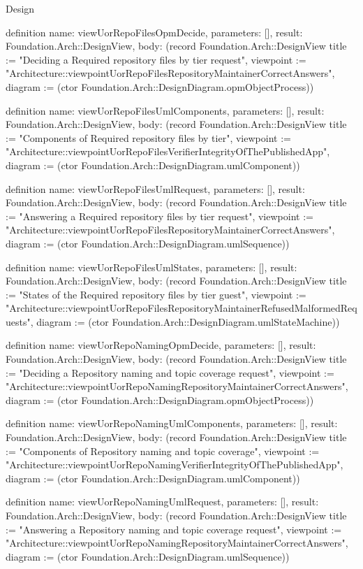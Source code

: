 \begin{lexlean}{Design}
\begin{semanticmodule}
definition{
  name: viewUorRepoFilesOpmDecide,
  parameters: [],
  result: Foundation.Arch::DesignView,
  body: (record Foundation.Arch::DesignView {title := "Deciding a Required repository files by tier request", viewpoint := "Architecture::viewpointUorRepoFilesRepositoryMaintainerCorrectAnswers", diagram := (ctor Foundation.Arch::DesignDiagram.opmObjectProcess)})
}

definition{
  name: viewUorRepoFilesUmlComponents,
  parameters: [],
  result: Foundation.Arch::DesignView,
  body: (record Foundation.Arch::DesignView {title := "Components of Required repository files by tier", viewpoint := "Architecture::viewpointUorRepoFilesVerifierIntegrityOfThePublishedApp", diagram := (ctor Foundation.Arch::DesignDiagram.umlComponent)})
}

definition{
  name: viewUorRepoFilesUmlRequest,
  parameters: [],
  result: Foundation.Arch::DesignView,
  body: (record Foundation.Arch::DesignView {title := "Answering a Required repository files by tier request", viewpoint := "Architecture::viewpointUorRepoFilesRepositoryMaintainerCorrectAnswers", diagram := (ctor Foundation.Arch::DesignDiagram.umlSequence)})
}

definition{
  name: viewUorRepoFilesUmlStates,
  parameters: [],
  result: Foundation.Arch::DesignView,
  body: (record Foundation.Arch::DesignView {title := "States of the Required repository files by tier guest", viewpoint := "Architecture::viewpointUorRepoFilesRepositoryMaintainerRefusedMalformedRequests", diagram := (ctor Foundation.Arch::DesignDiagram.umlStateMachine)})
}

definition{
  name: viewUorRepoNamingOpmDecide,
  parameters: [],
  result: Foundation.Arch::DesignView,
  body: (record Foundation.Arch::DesignView {title := "Deciding a Repository naming and topic coverage request", viewpoint := "Architecture::viewpointUorRepoNamingRepositoryMaintainerCorrectAnswers", diagram := (ctor Foundation.Arch::DesignDiagram.opmObjectProcess)})
}

definition{
  name: viewUorRepoNamingUmlComponents,
  parameters: [],
  result: Foundation.Arch::DesignView,
  body: (record Foundation.Arch::DesignView {title := "Components of Repository naming and topic coverage", viewpoint := "Architecture::viewpointUorRepoNamingVerifierIntegrityOfThePublishedApp", diagram := (ctor Foundation.Arch::DesignDiagram.umlComponent)})
}

definition{
  name: viewUorRepoNamingUmlRequest,
  parameters: [],
  result: Foundation.Arch::DesignView,
  body: (record Foundation.Arch::DesignView {title := "Answering a Repository naming and topic coverage request", viewpoint := "Architecture::viewpointUorRepoNamingRepositoryMaintainerCorrectAnswers", diagram := (ctor Foundation.Arch::DesignDiagram.umlSequence)})
}


\end{semanticmodule}
\end{lexlean}

